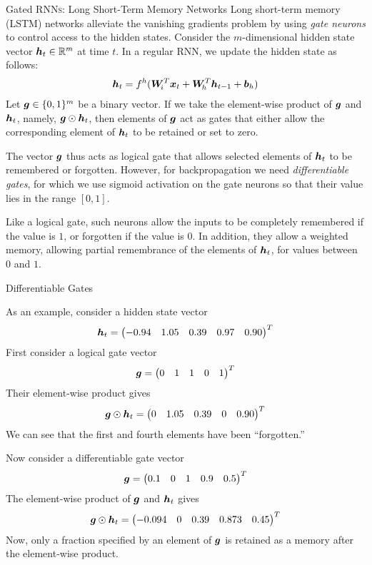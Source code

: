 %
\begin{frame}{Gated RNN\textsc{s}: Long Short-Term Memory Networks}
Long short-term memory (LSTM) networks alleviate the vanishing gradients
problem by using {\em
gate neurons} to control access to the hidden states.
Consider the $m$-dimensional hidden state vector ${\boldsymbol h}_{t} \in {\mathord{\mathbb R}}^m$ 
at time $t$. In a regular RNN, we update the hidden state as follows: %
\begin{align*}
    {\boldsymbol h}_t = f^h({\boldsymbol W}_{\!i}^T {\boldsymbol x}_t + {\boldsymbol W}_{\!h}^T
    {\boldsymbol h}_{t-1} + {\boldsymbol b}_{h})
\end{align*}
Let ${\boldsymbol g} \in \{0,1\}^m$ be a binary vector. If we take the element-wise
product of ${\boldsymbol g}$ and ${\boldsymbol h}_t$, namely, ${\boldsymbol g} \odot {\boldsymbol h}_{t}$, 
then elements of ${\boldsymbol g}$ act as gates that 
either allow the corresponding element of ${\boldsymbol h}_t$ to be retained or set
to zero. 


\medskip

The vector ${\boldsymbol g}$ thus acts as logical gate that allows selected
elements of ${\boldsymbol h}_t$ to be remembered or forgotten. However, for
backpropagation we need {\em differentiable gates}, for which we use
sigmoid activation on the gate neurons so that their value lies in the
range $[0,1]$. 


\medskip

Like a logical gate, such neurons allow the inputs to be
completely remembered if the value is $1$, or forgotten if the value is
$0$. In addition, they allow a weighted memory, allowing partial
remembrance of the elements of ${\boldsymbol h}_t$, for values between $0$
and $1$.
\end{frame}
%
\begin{frame}{Differentiable Gates}

    As an example, consider a hidden state vector
    \begin{align*}
        {\boldsymbol h}_t = \begin{pmatrix} -0.94 & 1.05 & 0.39 & 0.97 & 0.90 \end{pmatrix}^T
    \end{align*}
    First consider a logical gate vector
    \begin{align*}
        {\boldsymbol g} = \begin{pmatrix} 0 & 1 & 1 & 0 & 1 \end{pmatrix}^T
    \end{align*}
    Their element-wise product gives
    \begin{align*}
        {\boldsymbol g} \odot {\boldsymbol h}_{t} = \begin{pmatrix} 0 & 1.05 & 0.39 & 0 & 0.90 \end{pmatrix}^T
    \end{align*}
    We can see that the first and fourth elements have been
    ``forgotten.''

    Now consider a differentiable gate vector
    \begin{align*}
        {\boldsymbol g} = \begin{pmatrix} 0.1 & 0 & 1 & 0.9 & 0.5 \end{pmatrix}^T
    \end{align*}
    The element-wise product of ${\boldsymbol g}$ and ${\boldsymbol h}_t$ gives
    \begin{align*}
        {\boldsymbol g} \odot {\boldsymbol h}_{t} = \begin{pmatrix} -0.094 & 0 & 0.39 & 0.873 & 0.45 \end{pmatrix}^T
    \end{align*}
    Now, only a fraction specified by an element of ${\boldsymbol g}$ is
    retained as a memory after the element-wise product.
\end{frame}
